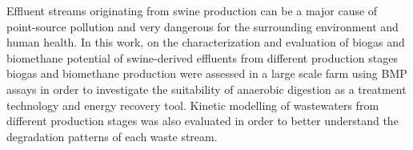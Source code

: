 Effluent streams originating from swine production can be a major cause of point-source pollution and very dangerous for the surrounding environment and human health. In this work, on the characterization and evaluation of biogas and biomethane potential of swine-derived effluents from different production stages biogas and biomethane production were assessed in a large scale farm using BMP assays in order to investigate the suitability of anaerobic digestion as a treatment technology and energy recovery tool. Kinetic modelling of wastewaters from different production stages was also evaluated in order to better understand the degradation patterns of each waste stream.